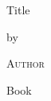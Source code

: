 \documentclass[
 12pt,   %
 a4paper %
]{book}
\begin{document}
 \begin{titlepage}
  \centering\vspace*{6cm}

  { \Huge Title\par }

  \vspace{1.5cm}

  by

  { \Large\textsc{Author}\par }
 \end{titlepage}

 \CustomToC %

 Book
\end{document}
